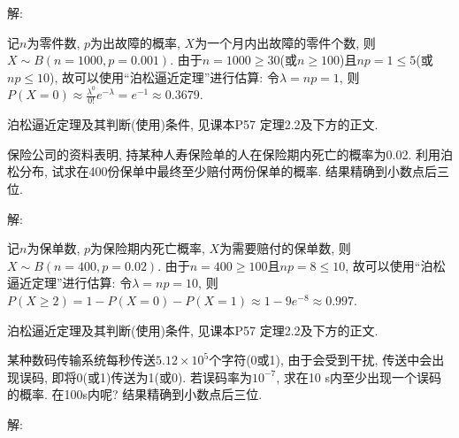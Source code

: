 \documentclass[standard]{ExBook}
\begin{document}
\begin{qitems}
    \begin{bbox}
解: 

记$n$为零件数, $p$为出故障的概率, $X$为一个月内出故障的零件个数, 则$X\sim B(n=1000,p=0.001)$. 由于$n=1000\geq30$(或$n\geq100$)且$np=1 \leq 5$(或$np \leq 10$), 故可以使用``泊松逼近定理''进行估算: 令$\lambda=np=1$, 则$P(X=0)\approx\frac{\lambda^{0}}{0!}e^{-\lambda}=e^{-1}\approx0.3679$.

\textcolor{themeColor}{\selectfont {} 泊松逼近定理及其判断(使用)条件, 见课本P57 定理2.2及下方的正文.}
    \end{bbox}

\vspace{-5em}

    \begin{bbox}
    \begin{shaded}
        \qitem
保险公司的资料表明, 持某种人寿保险单的人在保险期内死亡的概率为0.02. 利用泊松分布, 试求在400份保单中最终至少赔付两份保单的概率. 结果精确到小数点后三位.
    \end{shaded}
    \end{bbox}

\vspace{-5em}

    \begin{bbox}
解: 

记$n$为保单数, $p$为保险期内死亡概率, $X$为需要赔付的保单数, 则$X\sim B(n=400,p=0.02)$. 由于$n=400\geq100$且$np=8 \leq 10$, 故可以使用``泊松逼近定理''进行估算: 令$\lambda=np=10$, 则$P(X \geq 2)=1-P(X=0)-P(X=1)\approx1-9e^{-8}\approx0.997$.

\textcolor{themeColor}{\selectfont {} 泊松逼近定理及其判断(使用)条件, 见课本P57 定理2.2及下方的正文.}
    \end{bbox}

\vspace{-5em}

    \begin{bbox}
    \begin{shaded}
        \qitem
某种数码传输系统每秒传送$5.12\times10^5$个字符(0或1), 由于会受到干扰, 传送中会出现误码, 即将0(或1)传送为1(或0). 若误码率为$10^{-7}$, 求在10 s内至少出现一个误码的概率. 在100s内呢? 结果精确到小数点后三位.
    \end{shaded}
    \end{bbox}

\vspace{-5em}

    \begin{bbox}
解: 


\end{bbox}
\end{qitems}
\end{document}
